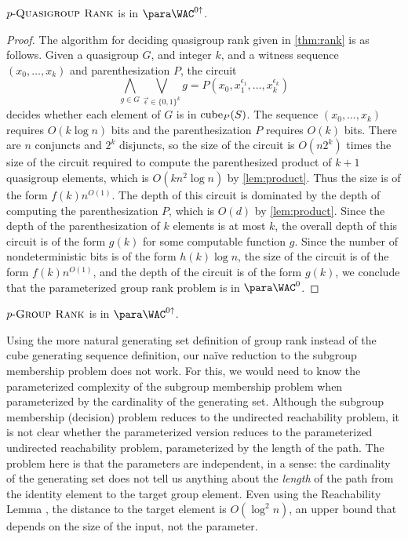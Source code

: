 \begin{theorem}
   $p \textnormal{-} \textsc{Quasigroup Rank}$ is in $\para \WAC^{0\uparrow}$.
\end{theorem}
\begin{proof}
  The algorithm for deciding quasigroup rank given in \autoref{thm:rank} is as follows.
  Given a quasigroup $G$, and integer $k$, and a witness sequence $(x_0, \dotsc, x_k)$ and parenthesization $P$, the circuit
  \[
  \bigwedge_{g \in G} \bigvee_{\vec{\epsilon} \in \{0, 1\}^k} g = P(x_0, x_1^{\epsilon_1}, \dotsc, x_k^{\epsilon_k})
  \]
  decides whether each element of $G$ is in $\operatorname{cube}_P(S)$.
  The sequence $(x_0, \dotsc, x_k)$ requires $O(k \log n)$ bits and the parenthesization $P$ requires $O(k)$ bits.
  There are $n$ conjuncts and $2^k$ disjuncts, so the size of the circuit is $O(n 2^k)$ times the size of the circuit required to compute the parenthesized product of $k + 1$ quasigroup elements, which is $O(k n^2 \log n)$ by \autoref{lem:product}.
  Thus the size is of the form $f(k) n^{O(1)}$.
  The depth of this circuit is dominated by the depth of computing the parenthesization $P$, which is $O(d)$ by \autoref{lem:product}.
  Since the depth of the parenthesization of $k$ elements is at most $k$, the overall depth of this circuit is of the form $g(k)$ for some computable function $g$.
  Since the number of nondeterministic bits is of the form $h(k) \log n$, the size of the circuit is of the form $f(k) n^{O(1)}$, and the depth of the circuit is of the form $g(k)$, we conclude that the parameterized group rank problem is in $\para \WAC^0$.
\end{proof}

\begin{corollary}
  $p \textnormal{-} \textsc{Group Rank}$ is in $\para \WAC^{0\uparrow}$.
\end{corollary}

Using the more natural generating set definition of group rank instead of the cube generating sequence definition, our naïve reduction to the subgroup membership problem does not work.
For this, we would need to know the parameterized complexity of the subgroup membership problem when parameterized by the cardinality of the generating set.
Although the subgroup membership (decision) problem reduces to the undirected reachability problem, it is not clear whether the parameterized version reduces to the parameterized undirected reachability problem, parameterized by the length of the path.
The problem here is that the parameters are independent, in a sense: the cardinality of the generating set does not tell us anything about the \emph{length} of the path from the identity element to the target group element.
Even using the Reachability Lemma \autocite[Theorem~3.1]{bs84}, the distance to the target element is $O(\log^2 n)$, an upper bound that depends on the size of the input, not the parameter.

